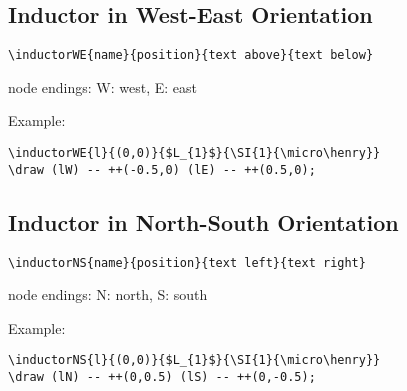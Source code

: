 \documentclass[parskip=full]{scrartcl}
\begin{document}
\subsection{Inductor in West-East Orientation}

\begin{verbatim}
\inductorWE{name}{position}{text above}{text below}
\end{verbatim}
node endings: W: west, E: east

Example:\\
\begin{minipage}{0.8\textwidth}
\begin{verbatim}
\inductorWE{l}{(0,0)}{$L_{1}$}{\SI{1}{\micro\henry}}
\draw (lW) -- ++(-0.5,0) (lE) -- ++(0.5,0);
\end{verbatim}
\end{minipage}
\begin{minipage}{0.19\textwidth}
\end{minipage}

\subsection{Inductor in North-South Orientation}

\begin{verbatim}
\inductorNS{name}{position}{text left}{text right}
\end{verbatim}
node endings: N: north, S: south

Example:\\
\begin{minipage}{0.8\textwidth}
\begin{verbatim}
\inductorNS{l}{(0,0)}{$L_{1}$}{\SI{1}{\micro\henry}}
\draw (lN) -- ++(0,0.5) (lS) -- ++(0,-0.5);
\end{verbatim}
\end{minipage}
\begin{minipage}{0.19\textwidth}
\end{minipage}
\end{document}
